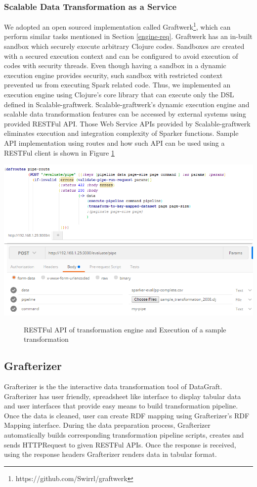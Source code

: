 \subsubsection{Scalable Data Transformation as a Service}
We adopted an open sourced implementation called Graftwerk\footnote{https://github.com/Swirrl/graftwerk}, which can perform similar tasks mentioned in Section \ref{engine-req}. Graftwerk has an in-built sandbox which securely execute arbitrary Clojure codes. Sandboxes are created with a secured execution context and can be configured to avoid execution of codes with security threads. Even though having a sandbox in a dynamic execution engine provides security, such sandbox with restricted context prevented us from executing Spark related code. Thus, we implemented an execution engine using Clojure's core library that can execute only the DSL defined in Scalable-graftwerk. Scalable-graftwerk's dynamic execution engine and scalable data transformation features can be accessed by external systems using provided RESTFul API.  Those Web Service APIs provided by Scalable-graftwerk eliminates execution and integration complexity of Sparker functions. 
Sample API implementation using routes and how such API can be used using a RESTFul client is shown in Figure \ref{fig:sample-route} 
\begin{center}
\includegraphics[width=36em]{./Figures/sample-route}
\begin{figure}[htbp]
\caption{RESTFul API of transformation engine and Execution of a sample transformation}
\label{fig:sample-route}
\end{figure}
\end{center}
\subsection{Grafterizer}
Grafterizer is the the interactive data transformation tool of DataGraft. Grafterizer has user friendly, spreadsheet like interface to display tabular data and user interfaces that provide easy means to build transformation pipeline. Once the data is cleaned, user can create RDF mapping using Grafterizer's RDF Mapping interface. During the data preparation process, Grafterizer automatically builds corresponding transformation pipeline scripts, creates and sends HTTPRequest to given RESTFul APIs. Once the response is received, using the response headers Grafterizer renders data in tabular format. 

